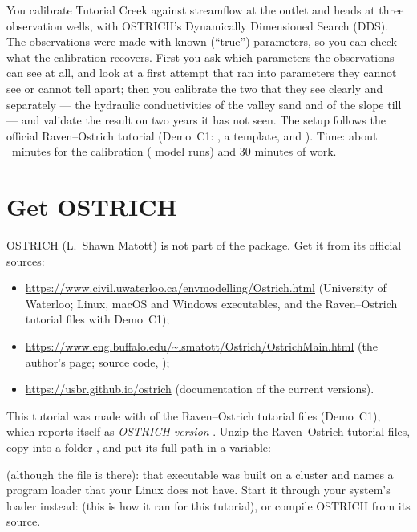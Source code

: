 
\begin{goal}
You calibrate Tutorial Creek against streamflow at the outlet and heads at three observation wells, with OSTRICH's
Dynamically Dimensioned Search (DDS). The observations were made with known (``true'') parameters, so you can check what
the calibration recovers. First you ask which parameters the observations can see at all, and look at a first attempt
that ran into parameters they cannot see or cannot tell apart; then you calibrate the two that they see clearly and
separately --- the hydraulic conductivities of the valley sand and of the slope till --- and validate the result on two
years it has not seen. The setup follows the official Raven--Ostrich tutorial (Demo~C1:
, a template,  and ). Time: about ~minutes for the
calibration ( model runs) and 30 minutes of work.
\end{goal}

\section{Get OSTRICH}
OSTRICH (L.~Shawn Matott) is not part of the package. Get it from its official sources:
\begin{itemize}
\item \url{https://www.civil.uwaterloo.ca/envmodelling/Ostrich.html} (University of Waterloo; Linux, macOS and Windows
      executables, and the Raven--Ostrich tutorial files with Demo~C1);
\item \url{https://www.eng.buffalo.edu/~lsmatott/Ostrich/OstrichMain.html} (the author's page; source code, );
\item \url{https://usbr.github.io/ostrich} (documentation of the current versions).
\end{itemize}
This tutorial was made with  of the Raven--Ostrich tutorial files (Demo~C1), which
reports itself as \emph{OSTRICH version }. Unzip the Raven--Ostrich tutorial files, copy
 into a folder , and put its full path in a
variable:
\begin{trouble}
 (although the file is there): that executable was built on a cluster and
names a program loader that your Linux does not have. Start it through your system's loader instead:
 (this is how it ran
for this tutorial), or compile OSTRICH from its source.
\end{trouble}

